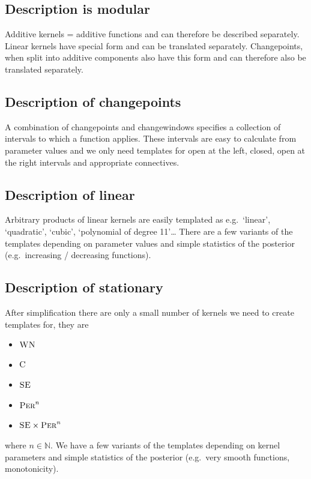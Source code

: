\documentclass{article}
\def\eg{e.g.\ }
\begin{document}
\subsection{Description is modular}

Additive kernels = additive functions and can therefore be described separately.
Linear kernels have special form and can be translated separately.
Changepoints, when split into additive components also have this form and can therefore also be translated separately.

\subsection{Description of changepoints}

A combination of changepoints and changewindows specifies a collection of intervals to which a function applies.
These intervals are easy to calculate from parameter values and we only need templates for open at the left, closed, open at the right intervals  and appropriate connectives.

\subsection{Description of linear}

Arbitrary products of linear kernels are easily templated as \eg `linear', `quadratic', `cubic', `polynomial of degree 11'\ldots
There are a few variants of the templates depending on parameter values and simple statistics of the posterior (\eg increasing / decreasing functions).

\subsection{Description of stationary}

After simplification there are only a small number of kernels we need to create templates for, they are
\begin{itemize}
  \itemsep0em
  \item ${\textsc{WN}}$
  \item ${\textsc{C}}$
  \item ${\textsc{SE}}$
  \item ${\textsc{Per}}^n$
  \item ${\textsc{SE}} \times {\textsc{Per}}^n$
\end{itemize}
where $n \in \mathbb{N}$.
We have a few variants of the templates depending on kernel parameters and simple statistics of the posterior (\eg very smooth functions, monotonicity).
\end{document}
